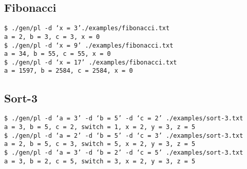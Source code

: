 \documentclass[letterpaper,11pt]{article}
\begin{document}
{{		\subsection {Fibonacci}
		{
			\texttt{\$ ./gen/pl -d `x = 3'./examples/fibonacci.txt}\\
			\texttt{a = 2, b = 3, c = 3, x = 0}\\
			\texttt{\$ ./gen/pl -d `x = 9' ./examples/fibonacci.txt}\\
			\texttt{a = 34, b = 55, c = 55, x = 0}\\
			\texttt{\$ ./gen/pl -d `x = 17' ./examples/fibonacci.txt}\\
			\texttt{a = 1597, b = 2584, c = 2584, x = 0}\\
		}
		
		\subsection {Sort-3}
		{
			\texttt{\$ ./gen/pl -d `a = 3' -d `b = 5' -d `c = 2' ./examples/sort-3.txt}\\
			\texttt{a = 3, b = 5, c = 2, switch = 1, x = 2, y = 3, z = 5}\\
			\texttt{\$ ./gen/pl -d `a = 2' -d `b = 5' -d `c = 3' ./examples/sort-3.txt}\\
			\texttt{a = 2, b = 5, c = 3, switch = 5, x = 2, y = 3, z = 5}\\
			\texttt{\$ ./gen/pl -d `a = 3' -d `b = 2' -d `c = 5' ./examples/sort-3.txt}\\
			\texttt{a = 3, b = 2, c = 5, switch = 3, x = 2, y = 3, z = 5}\\
		}
	}
}
\end{document}

